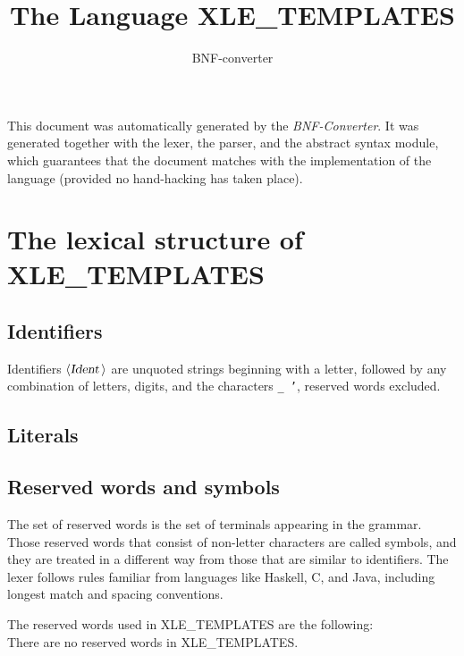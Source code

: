 \documentclass[a4paper,11pt]{article}
\author{BNF-converter}
\title{The Language XLE_TEMPLATES}
\begin{document}
\maketitle

\newcommand{\emptyP}{\mbox{$\epsilon$}}
\newcommand{\terminal}[1]{\mbox{{\texttt {#1}}}}
\newcommand{\nonterminal}[1]{\mbox{$\langle \mbox{{\sl #1 }} \! \rangle$}}
\newcommand{\arrow}{\mbox{::=}}
\newcommand{\delimit}{\mbox{$|$}}
\newcommand{\reserved}[1]{\mbox{{\texttt {#1}}}}
\newcommand{\literal}[1]{\mbox{{\texttt {#1}}}}
\newcommand{\symb}[1]{\mbox{{\texttt {#1}}}}

This document was automatically generated by the {\em BNF-Converter}. It was generated together with the lexer, the parser, and the abstract syntax module, which guarantees that the document matches with the implementation of the language (provided no hand-hacking has taken place).

\section*{The lexical structure of XLE_TEMPLATES}
\subsection*{Identifiers}
Identifiers \nonterminal{Ident} are unquoted strings beginning with a letter,
followed by any combination of letters, digits, and the characters {\tt \_ '},
reserved words excluded.


\subsection*{Literals}



\subsection*{Reserved words and symbols}
The set of reserved words is the set of terminals appearing in the grammar. Those reserved words that consist of non-letter characters are called symbols, and they are treated in a different way from those that are similar to identifiers. The lexer follows rules familiar from languages like Haskell, C, and Java, including longest match and spacing conventions.

The reserved words used in XLE_TEMPLATES are the following: \\

There are no reserved words in XLE_TEMPLATES.\\
\end{document}
